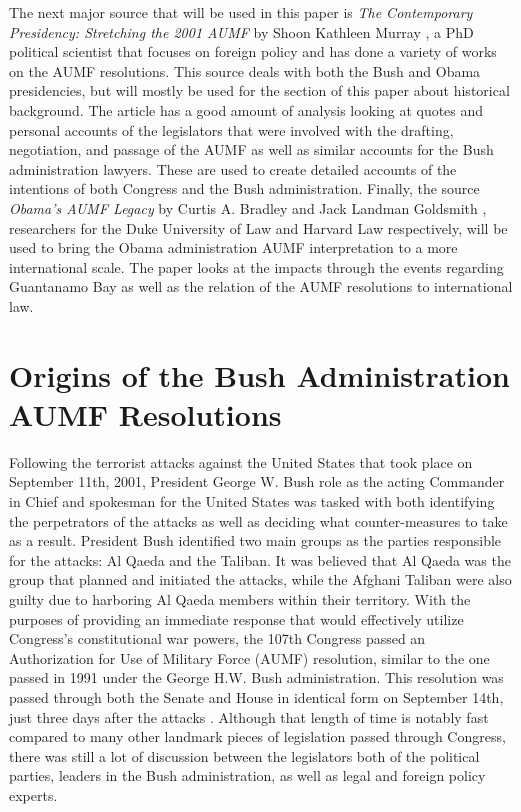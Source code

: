 \documentclass[12pt]{article}
\begin{document}
The next major source that will be used in this paper is \textit{The Contemporary Presidency: Stretching the 2001 AUMF} by Shoon Kathleen Murray \autocite{murray2015}, a PhD political scientist that focuses on foreign policy and has done a variety of works on the AUMF resolutions.
This source deals with both the Bush and Obama presidencies, but will mostly be used for the section of this paper about historical background.
The article has a good amount of analysis looking at quotes and personal accounts of the legislators that were involved with the drafting, negotiation, and passage of the AUMF as well as similar accounts for the Bush administration lawyers.
These are used to create detailed accounts of the intentions of both Congress and the Bush administration.
Finally, the source \textit{Obama's AUMF Legacy} by Curtis A. Bradley and Jack Landman Goldsmith \autocite{bradley2016}, researchers for the Duke University of Law and Harvard Law respectively, will be used to bring the Obama administration AUMF interpretation to a more international scale.
The paper looks at the impacts through the events regarding Guantanamo Bay as well as the relation of the AUMF resolutions to international law.

\section*{Origins of the Bush Administration AUMF Resolutions}
Following the terrorist attacks against the United States that took place on September 11th, 2001, President George W. Bush role as the acting Commander in Chief and spokesman for the United States was tasked with both identifying the perpetrators of the attacks as well as deciding what counter-measures to take as a result.
President Bush identified two main groups as the parties responsible for the attacks: Al Qaeda and the Taliban.
It was believed that Al Qaeda was the group that planned and initiated the attacks, while the Afghani Taliban were also guilty due to harboring Al Qaeda members within their territory.
With the purposes of providing an immediate response that would effectively utilize Congress's constitutional war powers, the 107th Congress passed an Authorization for Use of Military Force (AUMF) resolution, similar to the one passed in 1991 under the George H.W. Bush administration.
This resolution was passed through both the Senate and House in identical form on September 14th, just three days after the attacks \autocite{zotero-165}.
Although that length of time is notably fast compared to many other landmark pieces of legislation passed through Congress, there was still a lot of discussion between the legislators both of the political parties, leaders in the Bush administration, as well as legal and foreign policy experts.
\end{document}
